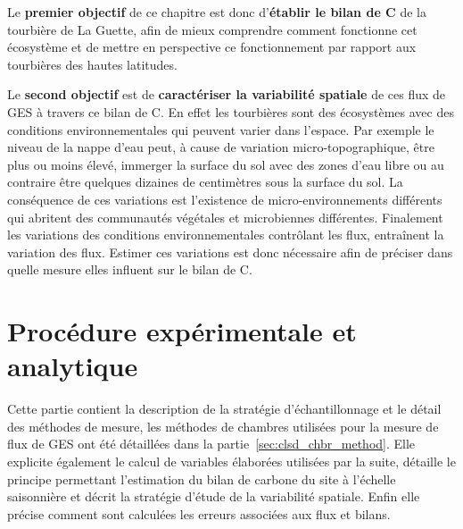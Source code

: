 Le \textbf{premier objectif} de ce chapitre est donc d'\textbf{établir le bilan de C} de la tourbière de La Guette, afin de mieux comprendre comment fonctionne cet écosystème et de mettre en perspective ce fonctionnement par rapport aux tourbières des hautes latitudes.

Le \textbf{second objectif} est de \textbf{caractériser la variabilité spatiale} de ces flux de GES à travers ce bilan de C.
En effet les tourbières sont des écosystèmes avec des conditions environnementales qui peuvent varier dans l'espace.
Par exemple le niveau de la nappe d'eau peut, à cause de variation micro-topographique, être plus ou moins élevé, immerger la surface du sol avec des zones d'eau libre ou au contraire être quelques dizaines de centimètres sous la surface du sol.
La conséquence de ces variations est l'existence de micro-environnements différents qui abritent des communautés végétales et microbiennes différentes.
Finalement les variations des conditions environnementales contrôlant les flux, entraînent la variation des flux.
Estimer ces variations est donc nécessaire afin de préciser dans quelle mesure elles influent sur le bilan de C.

\section{Procédure expérimentale et analytique}

Cette partie contient la description de la stratégie d'échantillonnage et le détail des méthodes de mesure, les méthodes de chambres utilisées pour la mesure de flux de GES ont été détaillées dans la partie~\ref{sec:clsd_chbr_method}.
Elle explicite également le calcul de variables élaborées utilisées par la suite, détaille le principe permettant l'estimation du bilan de carbone du site à l'échelle saisonnière et décrit la stratégie d'étude de la variabilité spatiale.
Enfin elle précise comment sont calculées les erreurs associées aux flux et bilans.

